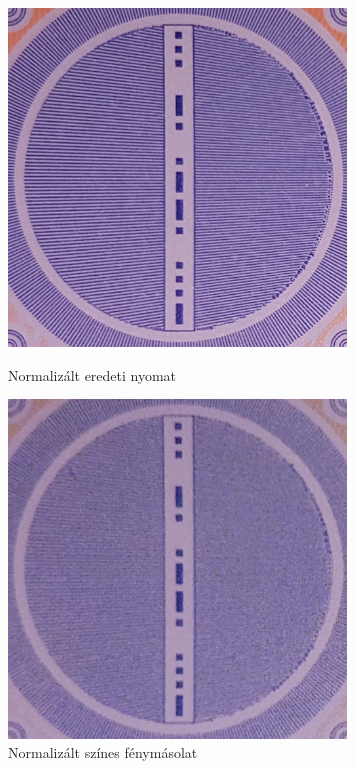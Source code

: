 \begin{figure}[h]{}
	
	\begin{minipage}[r]{0.5\linewidth}
		\centering
		\includegraphics[width=0.8\textwidth]{img/normalized-eredeti-pelda.png}
		\caption{Normalizált eredeti nyomat}
		\label{fig:normalized-eredeti.pelda}
		
	\end{minipage}\hfill
	\begin{minipage}[l]{0.5\linewidth}
		\centering
		\includegraphics[width=0.8\textwidth]{img/normalized-copy-pelda.png}
		\caption{Normalizált színes fénymásolat}
		\label{fig:normalized-copy.pelda}
		
	\end{minipage}
	
\end{figure}

